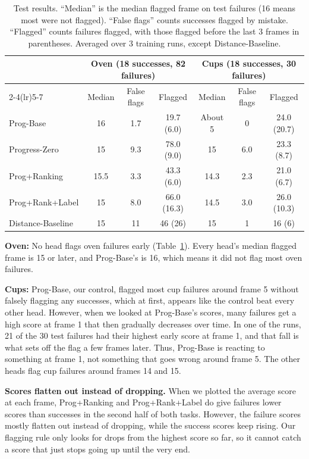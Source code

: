 \documentclass{article}
\begin{document}
\begin{table}[t]
\centering
\small
\begin{tabular}{lcccccc}
\toprule
 & \multicolumn{3}{c}{Oven (18 successes, 82 failures)} & \multicolumn{3}{c}{Cups (18 successes, 30 failures)} \\
\cmidrule(lr){2-4}\cmidrule(lr){5-7}
 & Median & False flags & Flagged & Median & False flags & Flagged \\
\midrule
Prog-Base         & 16   & 1.7 & 19.7 (6.0)  & About 5 & 0   & 24.0 (20.7) \\
Progress-Zero     & 15   & 9.3 & 78.0 (9.0)  & 15      & 6.0 & 23.3 (8.7) \\
Prog+Ranking      & 15.5 & 3.3 & 43.3 (6.0)  & 14.3    & 2.3 & 21.0 (6.7) \\
Prog+Rank+Label   & 15   & 8.0 & 66.0 (16.3) & 14.5    & 3.0 & 26.0 (10.3) \\
Distance-Baseline & 15   & 11  & 46 (26)     & 15      & 1   & 16 (6) \\
\bottomrule
\end{tabular}
\caption{Test results. ``Median'' is the median flagged frame on test failures (16 means most were not flagged). ``False flags'' counts successes flagged by mistake. ``Flagged'' counts failures flagged, with those flagged before the last 3 frames in parentheses. Averaged over 3 training runs, except Distance-Baseline.}
\label{tab:results}
\end{table}

\textbf{Oven:} No head flags oven failures early (Table~\ref{tab:results}). Every head's median flagged frame is 15 or later, and Prog-Base's is 16, which means it did not flag most oven failures.

\textbf{Cups:} Prog-Base, our control, flagged most cup failures around frame 5 without falsely flagging any successes, which at first, appears like the control beat every other head. However, when we looked at Prog-Base's scores, many failures get a high score at frame 1 that then gradually decreases over time. In one of the runs, 21 of the 30 test failures had their highest early score at frame 1, and that fall is what sets off the flag a few frames later. Thus, Prog-Base is reacting to something at frame 1, not something that goes wrong around frame 5. The other heads flag cup failures around frames 14 and 15.

\textbf{Scores flatten out instead of dropping.} When we plotted the average score at each frame, Prog+Ranking and Prog+Rank+Label do give failures lower scores than successes in the second half of both tasks. However, the failure scores mostly flatten out instead of dropping, while the success scores keep rising. Our flagging rule only looks for drops from the highest score so far, so it cannot catch a score that just stops going up until the very end.
\end{document}
